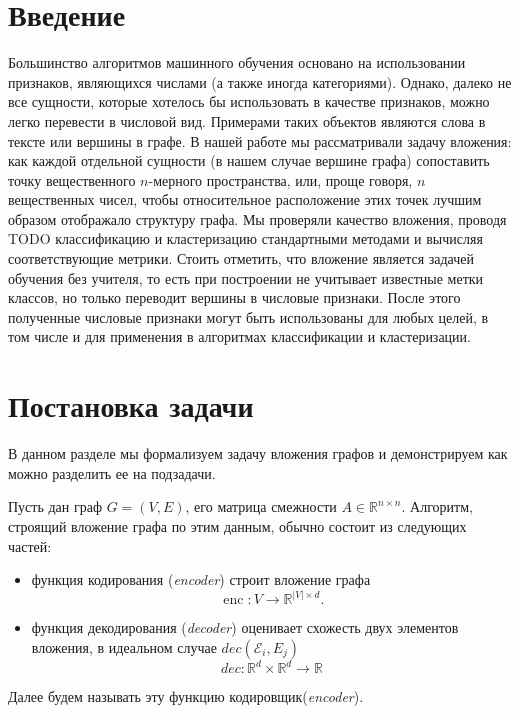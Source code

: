\documentclass[12pt,a4paper]{extarticle}
\newcommand{\R}{\mathbb{R}}
\newcommand{\e}{\operatorname{enc}}
\begin{document}
    \tableofcontents

    \newpage

    \section{Введение}
    Большинство алгоритмов машинного обучения основано на использовании
    признаков, являющихся числами (а также иногда категориями).
    Однако, далеко не все сущности, которые хотелось бы использовать в качестве признаков,
    можно легко перевести в числовой вид.
    Примерами таких объектов являются слова в тексте или вершины в графе.
    В нашей работе мы рассматривали задачу вложения: как каждой отдельной сущности (в нашем
    случае вершине графа) сопоставить точку вещественного $n$-мерного пространства,
    или, проще говоря, $n$ вещественных чисел, чтобы относительное
    расположение этих точек лучшим образом отображало структуру графа.
    Мы проверяли качество вложения, проводя TODO классификацию и кластеризацию
    стандартными методами и вычисляя соответствующие метрики.
    Стоить отметить, что вложение является задачей обучения без учителя,
    то есть при построении не учитывает известные метки классов, но только
    переводит вершины в числовые признаки.
    После этого полученные числовые признаки могут быть использованы для любых целей, в том числе и для
    применения в алгоритмах классификации и кластеризации.

    \section{Постановка задачи}
    В данном разделе мы формализуем задачу вложения графов и демонстрируем как можно разделить ее на подзадачи.

    Пусть дан граф $G = (V, E)$, его матрица смежности $A \in \R^{n \times n}$. Алгоритм, строящий вложение графа по этим данным, обычно состоит из следующих частей:
    \begin{itemize}
        \item функция кодирования (\textit{encoder}) строит вложение графа
            \[\e: V \to \R^{|V| \times d}.\]
        \item функция декодирования (\textit{decoder}) оценивает схожесть двух элементов вложения, в идеальном случае $dec(\mathcal{E}_i, E_j)$
            \[dec: \R^{d} \times \R^{d} \to \R\]
    \end{itemize}
    
    Далее будем называть эту функцию кодировщик(\textit{encoder}).


    \subsection{}



    
    
\end{document}
